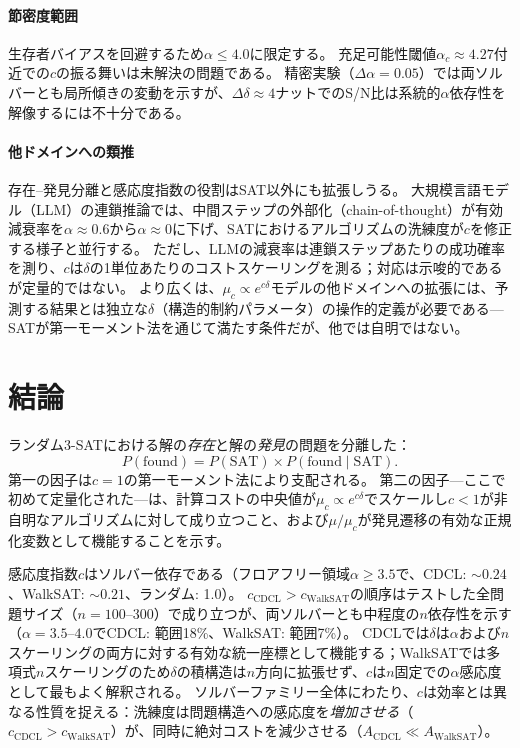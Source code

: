 \documentclass[11pt,a4paper]{article}
\newcommand{\mc}{\mu_c}
\newcommand{\Pfound}{P(\text{found})}
\newcommand{\PSAT}{P(\text{SAT})}
\newcommand{\PfSAT}{P(\text{found}\mid\text{SAT})}
\begin{document}
\paragraph{節密度範囲}
生存者バイアスを回避するため$\alpha \leq 4.0$に限定する。
充足可能性閾値$\alpha_c \approx 4.27$付近での$c$の振る舞いは未解決の問題である。
精密実験（$\Delta\alpha = 0.05$）では両ソルバーとも局所傾きの変動を示すが、$\Delta\delta \approx 4$ナットでのS/N比は系統的$\alpha$依存性を解像するには不十分である。

\paragraph{他ドメインへの類推}
存在--発見分離と感応度指数の役割はSAT以外にも拡張しうる。
大規模言語モデル（LLM）の連鎖推論では、中間ステップの外部化（chain-of-thought）が有効減衰率を$\alpha \approx 0.6$から$\alpha \approx 0$に下げ、SATにおけるアルゴリズムの洗練度が$c$を修正する様子と並行する。
ただし、LLMの減衰率は連鎖ステップあたりの成功確率を測り、$c$は$\delta$の1単位あたりのコストスケーリングを測る；対応は示唆的であるが定量的ではない。
より広くは、$\mc \propto e^{c\delta}$モデルの他ドメインへの拡張には、予測する結果とは独立な$\delta$（構造的制約パラメータ）の操作的定義が必要である---SATが第一モーメント法を通じて満たす条件だが、他では自明ではない。


\section{結論}
\label{sec:conclusion}

ランダム3-SATにおける解の\emph{存在}と解の\emph{発見}の問題を分離した：
\[
\Pfound = \PSAT \times \PfSAT.
\]
第一の因子は$c = 1$の第一モーメント法により支配される。
第二の因子---ここで初めて定量化された---は、計算コストの中央値が$\mc \propto e^{c\delta}$でスケールし$c < 1$が非自明なアルゴリズムに対して成り立つこと、および$\mu/\mc$が発見遷移の有効な正規化変数として機能することを示す。

感応度指数$c$はソルバー依存である（フロアフリー領域$\alpha \geq 3.5$で、CDCL: ${\sim}0.24$、WalkSAT: ${\sim}0.21$、ランダム: 1.0）。
$c_{\text{CDCL}} > c_{\text{WalkSAT}}$の順序はテストした全問題サイズ（$n = 100$--$300$）で成り立つが、両ソルバーとも中程度の$n$依存性を示す（$\alpha = 3.5$--$4.0$でCDCL: 範囲18\%、WalkSAT: 範囲7\%）。
CDCLでは$\delta$は$\alpha$および$n$スケーリングの両方に対する有効な統一座標として機能する；WalkSATでは多項式$n$スケーリング\cite{MuHoos2015}のため$\delta$の積構造は$n$方向に拡張せず、$c$は$n$固定での$\alpha$感応度として最もよく解釈される。
ソルバーファミリー全体にわたり、$c$は効率とは異なる性質を捉える：洗練度は問題構造への感応度を\emph{増加させる}（$c_{\text{CDCL}} > c_{\text{WalkSAT}}$）が、同時に絶対コストを減少させる（$A_{\text{CDCL}} \ll A_{\text{WalkSAT}}$）。
\end{document}
